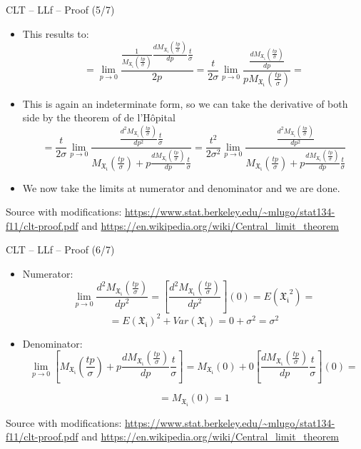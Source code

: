 \documentclass{beamer}
\begin{document}
\begin{frame}
{\centerline{CLT -- LLf -- Proof (5/7)}}

\begin{itemize}
\item This results to:
$$= \lim_{p \to 0} \frac{ \frac{1}{M_\mathfrak{X_i}(\frac{tp}{\sigma})} \frac{d M_\mathfrak{X_i}(\frac{tp}{\sigma})}{dp}\frac{t}{\sigma}}{2p} = \frac{t}{2\sigma}  \lim_{p \to 0} \frac{\frac{d M_\mathfrak{X_i}(\frac{tp}{\sigma})}{dp}}{pM_\mathfrak{X_i}(\frac{tp}{\sigma})} = $$
\item This is again an indeterminate form, so we can take the derivative of both side by the theorem of de l'H\^{o}pital
$$= \frac{t}{2\sigma} \lim_{p \to 0} \frac{ \frac{d^2 M_\mathfrak{X_i}(\frac{tp}{\sigma})}{dp^2}\frac{t}{\sigma} }
{M_\mathfrak{X_i}(\frac{tp}{\sigma})+ p \frac{d M_\mathfrak{X_i}(\frac{tp}{\sigma})}{dp}\frac{t}{\sigma}} =
 \frac{t^2}{2\sigma^2} \lim_{p \to 0} \frac{ \frac{d^2 M_\mathfrak{X_i}(\frac{tp}{\sigma})}{dp^2} }
{M_\mathfrak{X_i}(\frac{tp}{\sigma})+ p \frac{d M_\mathfrak{X_i}(\frac{tp}{\sigma})}{dp}\frac{t}{\sigma}}
$$
\item We now take the limits at numerator and denominator and we are done.

\end{itemize}

\begin{center}
\tiny 
Source with modifications: \url{https://www.stat.berkeley.edu/~mlugo/stat134-f11/clt-proof.pdf} and \url{https://en.wikipedia.org/wiki/Central_limit_theorem}
\end{center}
\end{frame}


\begin{frame}
{\centerline{CLT -- LLf -- Proof (6/7)}}

\begin{itemize}
\item Numerator:
$$ \lim_{p \to 0} \frac{d^2 M_\mathfrak{X_i}(\frac{tp}{\sigma})}{dp^2} = 
\left [ \frac{d^2 M_\mathfrak{X_i}(\frac{tp}{\sigma})}{dp^2} \right ] (0) = E(\mathfrak{X_i}^2) = $$
$$ = E(\mathfrak{X_i})^2 + Var(\mathfrak{X_i}) = 0 +\sigma^2 = \sigma^2 $$
\item Denominator:
$$ \lim_{p \to 0} \left [ M_\mathfrak{X_i}(\frac{tp}{\sigma})+ p \frac{d M_\mathfrak{X_i}(\frac{tp}{\sigma})}{dp}\frac{t}{\sigma} \right ] = M_\mathfrak{X_i}(0) + 0 \left [  \frac{d M_\mathfrak{X_i}(\frac{tp}{\sigma})}{dp}\frac{t}{\sigma} \right ] (0) = $$

$$ =  M_\mathfrak{X_i}(0) = 1 $$
\end{itemize}

\begin{center}
\tiny 
Source with modifications: \url{https://www.stat.berkeley.edu/~mlugo/stat134-f11/clt-proof.pdf} and \url{https://en.wikipedia.org/wiki/Central_limit_theorem}
\end{center}
\end{frame}
\end{document}
